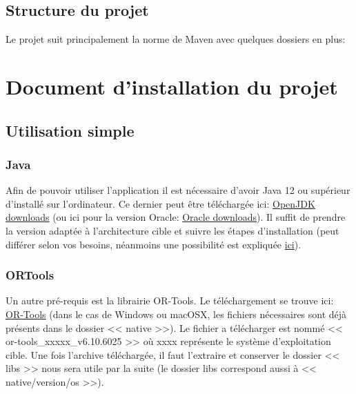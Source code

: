 \documentclass[final]{polytech/polytech}
\begin{document}
	\section{Structure du projet}
		Le projet suit principalement la norme de Maven avec quelques dossiers en plus:
	
\chapter{Document d'installation du projet}
	\section{Utilisation simple}
		\subsection{Java\label{sec:install:java}}
			Afin de pouvoir utiliser l'application il est nécessaire d'avoir Java 12 ou supérieur d'installé sur l'ordinateur.
			Ce dernier peut être téléchargée ici: \href{https://jdk.java.net/}{OpenJDK downloads} (ou ici pour la version Oracle: \href{https://www.oracle.com/technetwork/java/javase/downloads/index.html}{Oracle downloads}).
			Il suffit de prendre la version adaptée à l'architecture cible et suivre les étapes d'installation (peut différer selon vos besoins, néanmoins une possibilité est expliquée \href{https://stackoverflow.com/a/52531093/3281185}{ici}).

		\subsection{ORTools}
			Un autre pré-requis est la librairie OR-Tools.
			Le téléchargement se trouve ici: \href{https://github.com/google/or-tools/releases/tag/v6.10}{OR-Tools} (dans le cas de Windows ou macOSX, les fichiers nécessaires sont déjà présents dans le dossier << native >>).
			Le fichier a télécharger est nommé << or-tools\_xxxxx\_v6.10.6025 >> où xxxx représente le système d'exploitation cible.
			Une fois l'archive téléchargée, il faut l'extraire et conserver le dossier << libs >> nous sera utile par la suite (le dossier libs correspond aussi à << native/version/os >>).
\end{document}
